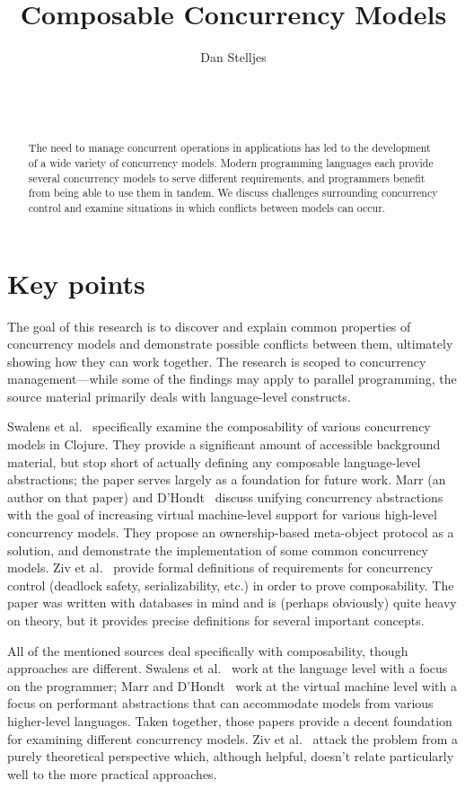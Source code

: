 \documentclass{sig-alternate}
\author{
\alignauthor{}
Dan Stelljes\\
  \affaddr{Division of Science and Mathematics}\\
  \affaddr{University of Minnesota, Morris}\\
  \affaddr{Morris, Minnesota, USA 56267}\\
  \email{stell124@morris.umn.edu}
}
\title{Composable Concurrency Models}
\begin{document}
\maketitle

\begin{abstract}

The need to manage concurrent operations in applications has led to the development of a wide variety of concurrency models. Modern programming languages each provide several concurrency models to serve different requirements, and programmers benefit from being able to use them in tandem. We discuss challenges surrounding concurrency control and examine situations in which conflicts between models can occur.

\end{abstract}

\section*{Key points}

The goal of this research is to discover and explain common properties of concurrency models and demonstrate possible conflicts between them, ultimately showing how they can work together. The research is scoped to concurrency management---while some of the findings may apply to parallel programming, the source material primarily deals with language-level constructs.

Swalens et al.~\cite{Swalens2014} specifically examine the composability of various concurrency models in Clojure. They provide a significant amount of accessible background material, but stop short of actually defining any composable language-level abstractions; the paper serves largely as a foundation for future work. Marr (an author on that paper) and D'Hondt~\cite{Marr2012} discuss unifying concurrency abstractions with the goal of increasing virtual machine-level support for various high-level concurrency models. They propose an ownership-based meta-object protocol as a solution, and demonstrate the implementation of some common concurrency models. Ziv et al.~\cite{Ziv2015} provide formal definitions of requirements for concurrency control (deadlock safety, serializability, etc.) in order to prove composability. The paper was written with databases in mind and is (perhaps obviously) quite heavy on theory, but it provides precise definitions for several important concepts.

All of the mentioned sources deal specifically with composability, though approaches are different. Swalens et al.~\cite{Swalens2014} work at the language level with a focus on the programmer; Marr and D'Hondt~\cite{Marr2012} work at the virtual machine level with a focus on performant abstractions that can accommodate models from various higher-level languages. Taken together, those papers provide a decent foundation for examining different concurrency models. Ziv et al.~\cite{Ziv2015} attack the problem from a purely theoretical perspective which, although helpful, doesn't relate particularly well to the more practical approaches.
\end{document}

